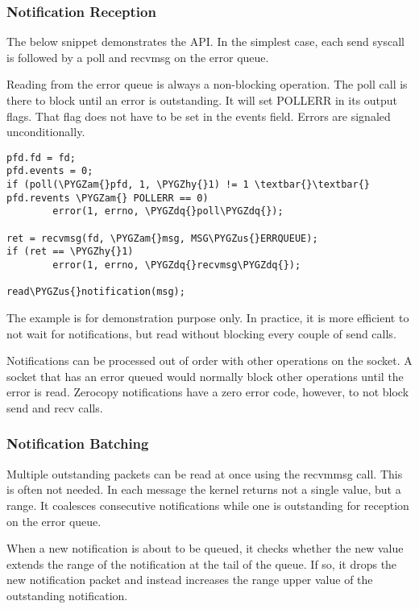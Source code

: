 \documentclass[a4paper,8pt,english]{sphinxmanual}
\def\PYGZus{\char`\_}
\def\PYGZam{\char`\&}
\def\PYGZhy{\char`\-}
\def\PYGZdq{\char`\"}
\begin{document}
\subsubsection{Notification Reception}
\label{networking/msg_zerocopy:notification-reception}
The below snippet demonstrates the API. In the simplest case, each
send syscall is followed by a poll and recvmsg on the error queue.

Reading from the error queue is always a non-blocking operation. The
poll call is there to block until an error is outstanding. It will set
POLLERR in its output flags. That flag does not have to be set in the
events field. Errors are signaled unconditionally.

\begin{Verbatim}[commandchars=\\\{\}]
pfd.fd = fd;
pfd.events = 0;
if (poll(\PYGZam{}pfd, 1, \PYGZhy{}1) != 1 \textbar{}\textbar{} pfd.revents \PYGZam{} POLLERR == 0)
        error(1, errno, \PYGZdq{}poll\PYGZdq{});

ret = recvmsg(fd, \PYGZam{}msg, MSG\PYGZus{}ERRQUEUE);
if (ret == \PYGZhy{}1)
        error(1, errno, \PYGZdq{}recvmsg\PYGZdq{});

read\PYGZus{}notification(msg);
\end{Verbatim}

The example is for demonstration purpose only. In practice, it is more
efficient to not wait for notifications, but read without blocking
every couple of send calls.

Notifications can be processed out of order with other operations on
the socket. A socket that has an error queued would normally block
other operations until the error is read. Zerocopy notifications have
a zero error code, however, to not block send and recv calls.


\subsubsection{Notification Batching}
\label{networking/msg_zerocopy:notification-batching}
Multiple outstanding packets can be read at once using the recvmmsg
call. This is often not needed. In each message the kernel returns not
a single value, but a range. It coalesces consecutive notifications
while one is outstanding for reception on the error queue.

When a new notification is about to be queued, it checks whether the
new value extends the range of the notification at the tail of the
queue. If so, it drops the new notification packet and instead increases
the range upper value of the outstanding notification.
\end{document}
